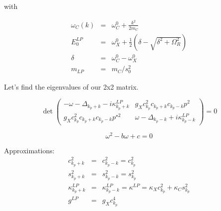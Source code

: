 \documentclass[a4paper,prb,10pt,aps,twocolumn]{revtex4-1}
\begin{document}
with 

\begin{subequations}
  \begin{eqnarray}
    \label{eq:66}
\omega_{C}(k)&=&\omega_{C}^{0}+\frac{k^{2}}{2m_{C}}\\
E_{0}^{LP}&=&\omega_{X}^{0}+\frac{1}{2}\left(\delta-\sqrt{\delta^{2}+\Omega_{R}^{2}}\right)\\
\delta&=&\omega_{C}^{0}-\omega_{X}^{0}\\
m_{LP}&=&m_{C}/s_{0}^{2}
  \end{eqnarray}
\end{subequations}


Let's find the eigenvalues of our 2x2 matrix.

\begin{equation}
  \label{eq:73}
\det\left(\begin{array}{cc}
-\omega-\Delta_{k_{p}+k}-i\kappa_{k_{p}+k}^{LP} & g_{X}c_{k_{p}}^{2}c_{k_{p}+k}c_{k_{p}-k}p^{2}\\
g_{X}c_{k_{p}}^{2}c_{k_{p}+k}c_{k_{p}-k}p^{\star2} & \omega-\Delta_{k_{p}-k}+i\kappa_{k_{p}-k}^{LP}
\end{array}\right)=0  
\end{equation}  


\begin{equation}
  \label{eq:82}
  \omega^{2}-b\omega+c=0
\end{equation}


Approximations: 
\begin{subequations}
  \begin{eqnarray}
    \label{eq:83}
c_{k_{p}+k}^{2}&=&c_{k_{p}-k}^{2}=c_{k_{p}}^{2}\\
s_{k_{p}+k}^{2}&=&s_{k_{p}-k}^{2}=s_{k_{p}}^{2}\\ \kappa_{k_{p}+k}^{LP}&=&\kappa_{k_{p}-k}^{LP}=\kappa^{LP}=\kappa_{X}c_{k_{p}}^{2}+\kappa_{C}s_{k_{p}}^{2}\\
g^{LP}&=&g_{X}c_{k_{p}}^{4}    
  \end{eqnarray}
\end{subequations}
\end{document}
